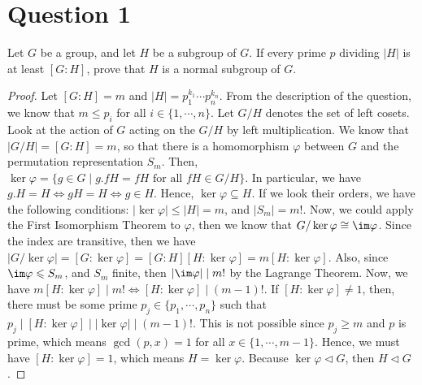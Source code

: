 \section{Question 1}

\begin{question}
    Let $G$ be a group, and let $H$ be a subgroup of $G$. If every prime $p$ dividing $|H|$ is at least $[G: H]$, prove that $H$ is a normal subgroup of $G$.
\end{question}

\begin{answer}
    \begin{proof}
        Let $[G:H] = m$ and $\lvert H \rvert = p_1^{k_1}\cdots p_n^{k_n}$. From the description of the question, we know that $m \leq p_i$ for all $i \in \{1,\cdots,n\}$. Let $G/H$ denotes the set of left cosets. Look at the action of $G$ acting on the $G/H$ by left multiplication. We know that $\lvert G/H \rvert = [G: H] = m$, so that there is a homomorphism $\varphi$ between $G$ and the permutation representation $S_m$. Then, $\ker \varphi = \{g \in G \mid g.fH = fH \text{ for all } fH \in G/H\}$. In particular, we have $g.H = H \Leftrightarrow gH = H \Leftrightarrow g \in H$. Hence, $\ker \varphi \subseteq H$. If we look their orders, we have the following conditions: $\lvert \ker \varphi \rvert \leq \lvert H \rvert = m$, and $\lvert S_m \rvert = m!$. Now, we could apply the First Isomorphism Theorem to $\varphi$, then we know that $G/\ker \varphi \cong \im \varphi$. Since the index are transitive, then we have $\lvert G/ \ker \varphi \rvert = [G:\ker\varphi] = [G:H][H:\ker\varphi] = m[H:\ker\varphi]$. Also, since $\im \varphi \leqslant S_m$, and $S_m$ finite, then $\lvert \im \varphi \rvert \mid m!$ by the Lagrange Theorem. Now, we have $m[H:\ker \varphi] \mid m! \Leftrightarrow [H:\ker\varphi] \mid (m-1)!$. If $[H:\ker \varphi] \neq 1$, then, there must be some prime $p_j \in \{p_1,\cdots,p_n\}$ such that $p_j \mid [H:\ker\varphi] \mid \lvert \ker \varphi \rvert \mid (m-1)!$. This is not possible since $p_j \geq m$ and $p$ is prime, which means $\gcd(p,x) = 1$ for all $x\in \{1,\cdots,m-1\}$. Hence, we must have $[H:\ker\varphi] = 1$, which means $H = \ker \varphi$. Because $\ker \varphi \triangleleft G$, then $H \triangleleft G$.
    \end{proof}
\end{answer}